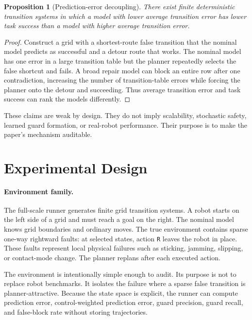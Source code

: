 \documentclass{article}
\newtheorem{proposition}{Proposition}
\begin{document}
\begin{proposition}[Prediction-error decoupling]
There exist finite deterministic transition systems in which a model with lower average transition error has lower task success than a model with higher average transition error.
\end{proposition}

\begin{proof}
Construct a grid with a shortest-route false transition that the nominal model predicts as successful and a detour route that works. The nominal model has one error in a large transition table but the planner repeatedly selects the false shortcut and fails. A broad repair model can block an entire row after one contradiction, increasing the number of transition-table errors while forcing the planner onto the detour and succeeding. Thus average transition error and task success can rank the models differently.
\end{proof}

These claims are weak by design. They do not imply scalability, stochastic safety, learned guard formation, or real-robot performance. Their purpose is to make the paper's mechanism auditable.

\section{Experimental Design}

\paragraph{Environment family.}
The full-scale runner generates finite grid transition systems. A robot starts on the left side of a grid and must reach a goal on the right. The nominal model knows grid boundaries and ordinary moves. The true environment contains sparse one-way rightward faults: at selected states, action \texttt{R} leaves the robot in place. These faults represent local physical failures such as sticking, jamming, slipping, or contact-mode change. The planner replans after each executed action.

The environment is intentionally simple enough to audit. Its purpose is not to replace robot benchmarks. It isolates the failure where a sparse false transition is planner-attractive. Because the state space is explicit, the runner can compute prediction error, control-weighted prediction error, guard precision, guard recall, and false-block rate without storing trajectories.
\end{document}
